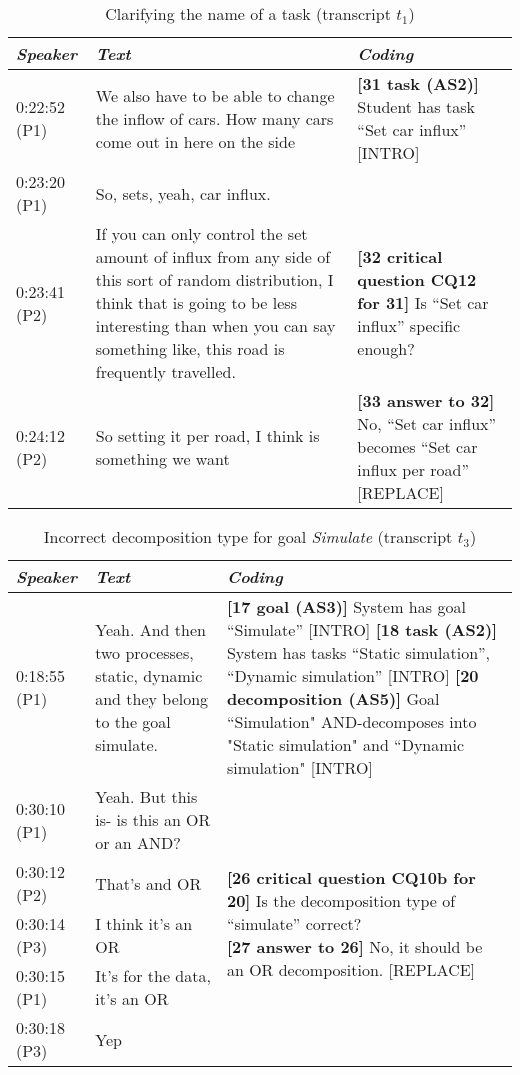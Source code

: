 \begin{table}[!htbp]
\centering
\begin{tabular}{|p{17mm}|p{63mm}|p{70mm}|}
\hline
\textit{Speaker} & \textit{Text} & \textit{Coding}\\
\hline
0:22:52 (P1) & We also have to be able to change the inflow of cars. How many cars come out in here on the side & \textbf{[31 task (AS2)]} Student has task ``Set car influx'' \textsf{[INTRO]}\\
\cline{1-2}
0:23:20 (P1)	& So, sets, yeah, car influx. & \\
\hline
0:23:41 (P2) &	If you can only control the set amount of influx from any side of this sort of random distribution, I think that is going to be less interesting than when you can say something like, this road is frequently travelled. 	& \textbf{[32 critical question CQ12 for 31]} Is ``Set car influx'' specific enough? \\
\hline
0:24:12 (P2)	& So setting it per road, I think is something we want	& \textbf{[33 answer to 32]} No, ``Set car influx'' becomes ``Set car influx per road'' \textsf{[REPLACE]} \\
\hline
\end{tabular}
\caption{Clarifying the name of a task (transcript $t_1$)}
\label{table:transcript:task-clarification}
\end{table}

\begin{table}[!htbp]
\centering
\begin{tabular}{|p{17mm}|p{43mm}|p{90mm}|}
\hline
\textit{Speaker} & \textit{Text} & \textit{Coding}\\
\hline
0:18:55 (P1) &Yeah. And then two processes, static, dynamic and they belong to the goal simulate. & \textbf{[17 goal (AS3)]} System has goal ``Simulate'' \textsf{[INTRO]}\newline
\textbf{[18 task (AS2)]} System has tasks ``Static simulation'', ``Dynamic simulation'' \textsf{[INTRO]}\newline  
\textbf{[20 decomposition (AS5)]} Goal ``Simulation" AND-decomposes into "Static simulation" and ``Dynamic simulation" \textsf{[INTRO]}\\
\hline
0:30:10 (P1) & 	Yeah. But this is- is this an OR or an AND? & \multirow{5}{90mm}{\textbf{[26 critical question CQ10b for 20]} Is the decomposition type of ``simulate'' correct?\newline
\textbf{[27 answer to 26]} No, it should be an OR decomposition. \textsf{[REPLACE]}}\\
\cline{1-2}
0:30:12 (P2) & That's and OR &\\
\cline{1-2}
0:30:14 (P3) & I think it's an OR &\\
\cline{1-2}
0:30:15 (P1) & It's for the data, it's an OR &\\
\cline{1-2}
0:30:18 (P3) & Yep &\\
\hline	
\end{tabular}
\caption{Incorrect decomposition type for goal \emph{Simulate} (transcript $t_3$)}
\label{table:transcript:decomposition}
\end{table}

